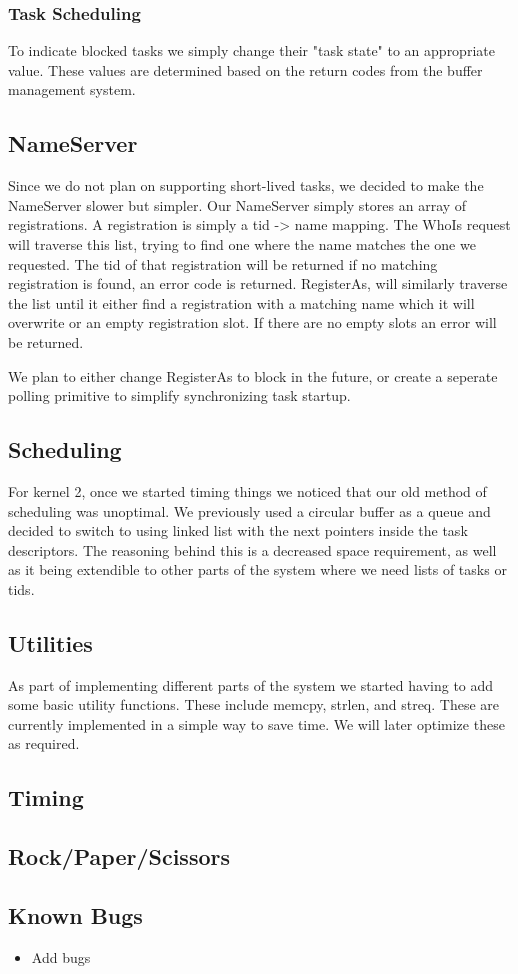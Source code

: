 \documentclass{article}
\begin{document}
\subsubsection{Task Scheduling}

To indicate blocked tasks we simply change their "task state" to an appropriate value. These values are determined based on the return codes from the buffer management system.

\subsection{NameServer}

Since we do not plan on supporting short-lived tasks, we decided to make the NameServer slower but simpler. Our NameServer simply stores an array of registrations. A registration is simply a tid -> name mapping. The WhoIs request will traverse this list, trying to find one where the name matches the one we requested. The tid of that registration will be returned if no matching registration is found, an error code is returned. RegisterAs, will similarly traverse the list until it either find a registration with a matching name which it will overwrite or an empty registration slot. If there are no empty slots an error will be returned.

We plan to either change RegisterAs to block in the future, or create a seperate polling primitive to simplify synchronizing task startup.

\subsection{Scheduling}

For kernel 2, once we started timing things we noticed that our old method of scheduling was unoptimal. We previously used a circular buffer as a queue and decided to switch to using linked list with the next pointers inside the task descriptors. The reasoning behind this is a decreased space requirement, as well as it being extendible to other parts of the system where we need lists of tasks or tids.

\subsection{Utilities}

As part of implementing different parts of the system we started having to add some basic utility functions. These include memcpy, strlen, and streq. These are currently implemented in a simple way to save time. We will later optimize these as required.

\subsection{Timing}

\subsection{Rock/Paper/Scissors}

\subsection{Known Bugs}
\begin{itemize}
    \item Add bugs
\end{itemize}
\end{document}
